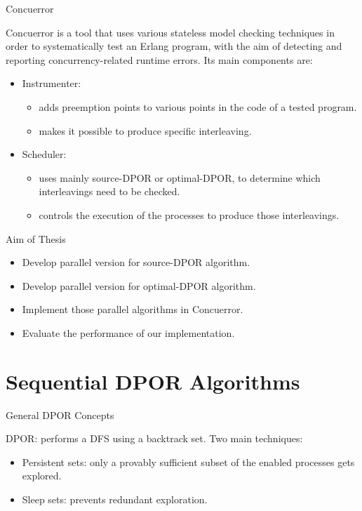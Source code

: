 \begin{frame} {Concuerror}

Concuerror is a tool that uses various stateless model checking techniques
in order to systematically 
test an Erlang program, with the aim of detecting and reporting concurrency-related runtime errors.
Its main components are:

\begin{itemize}[<+->]
\item Instrumenter:
  \begin{itemize}
  \item adds preemption points to various points in the code of a tested program.
  \item makes it possible to produce specific interleaving.
  \end{itemize}

\item Scheduler:
  \begin{itemize}
  \item uses mainly source-DPOR or optimal-DPOR, to determine which interleavings need to be checked.
  \item controls the execution of the processes to produce those interleavings.
  \end{itemize}
\end{itemize}

 
\end{frame}

\begin{frame}{Aim of Thesis}

\begin{itemize}[<+->]
    \item Develop parallel version for source-DPOR algorithm.
    \item Develop parallel version for optimal-DPOR algorithm.
    \item Implement those parallel algorithms in Concuerror.
    \item Evaluate the performance of our implementation.
\end{itemize}

\end{frame}

\section{Sequential DPOR Algorithms}


\begin{frame} {General DPOR Concepts}

DPOR: performs a DFS using a backtrack set. Two main techniques:
\begin{itemize}[<+->]
    \item Persistent sets: only a provably sufficient subset of the enabled processes gets explored.
    \item Sleep sets: prevents redundant exploration.
\end{itemize}

\end{frame}

